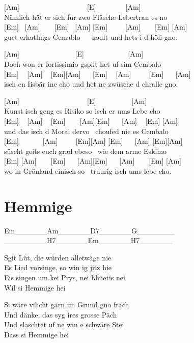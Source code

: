 \documentclass[
  letterpaper,
]{scrbook}
\begin{document}
{[}Am{]} ~ ~ ~ ~ ~ ~ ~ ~ ~ ~ ~ {[}E{]} ~ ~ ~ ~ ~{[}Am{]}\\
Nämlich hät er sich für zwo Fläsche Lebertran es no\\
{[}Em{]} ~{[}Am{]} ~ ~ {[}Em{]} ~{[}Am{]} {[}Em{]} ~ ~ ~{[}Am{]} ~ ~
{[}Em{]} {[}Am{]}\\
guet erhatlnigs Cemablo ~ ~kouft und hets i d höli gno.

{[}Am{]} ~ ~ ~ ~ ~ ~ ~ ~ ~ {[}E{]} ~ ~ ~ ~ ~ ~ ~ {[}Am{]}\\
Doch won er fortissimio gspilt het uf sim Cembalo\\
{[}Em{]} ~ {[}Am{]} ~ {[}Em{]}{[}Am{]} ~ ~{[}Em{]} ~ {[}Am{]} ~ ~
~{[}Em{]} ~ ~{[}Am{]}\\
isch en Iisbär ine cho und het ne zwüsche d chralle gno.

{[}Am{]} ~ ~ ~ ~ ~ ~ ~ ~ ~ ~ ~ {[}E{]} ~ ~ ~ ~ ~ ~{[}Am{]}\\
Kunst isch geng es Risiko so isch er ums Lebe cho\\
{[}Em{]} ~ {[}Am{]} ~ {[}Em{]} ~ ~ {[}Am{]}{[}Em{]} ~ ~{[}Am{]} ~
{[}Em{]} {[}Am{]}\\
und das isch d Moral dervo ~choufed nie es Cembalo\\
{[}Em{]} ~ ~ ~ ~{[}Am{]} ~ ~ ~{[}Em{]}{[}Am{]} {[}Em{]} ~ ~{[}Am{]}
{[}Em{]}{[}Am{]}\\
süscht geits euch grad ebeso ~wie dem arme Eskimo\\
{[}Em{]} {[}Am{]} ~ ~ {[}Em{]} ~ ~{[}Am{]}{[}Em{]} ~ ~{[}Am{]} ~ ~
{[}Em{]} {[}Am{]}\\
wo in Grönland einisch so ~truurig isch ums lebe cho.

\hypertarget{hemmige}{%
\chapter{Hemmige}\label{hemmige}}

\textbar Em\_\_\_\_\_\_\textbar Am\_\_\_\_\_\_\textbar D7\_\_\_\_\_\_\textbar G\_\_\_\_\_\_\_\textbar{}\\
\textbar\_\_\_\_\_\_\_\_\textbar H7\_\_\_\_\_\_\textbar Em\_\_\_\_\_\_\textbar H7\_\_\_\_\_\_\textbar{}

S\textquotesingle git Lüt, die würden alletwäge nie\\
Es Lied vorsinge, so win ig jitz hie\\
Eis singen um kei Prys, nei bhüetis nei\\
Wil si Hemmige hei

Si wäre vilicht gärn im Grund gno fräch\\
Und dänke, das syg ires grosse Päch\\
Und s\textquotesingle laschtet uf ne win e schwäre Stei\\
Dass si Hemmige hei
\end{document}
